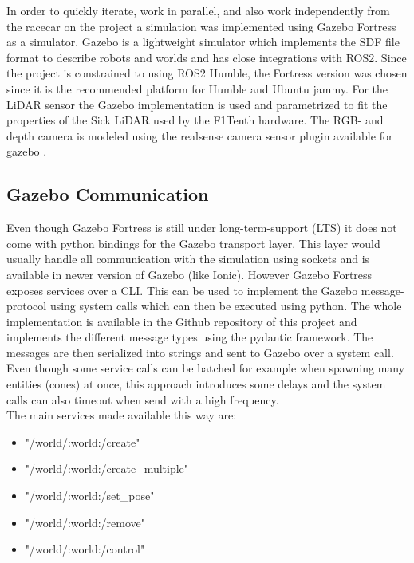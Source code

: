 In order to quickly iterate, work in parallel, and also work independently from the racecar on the project a simulation was implemented using Gazebo Fortress as a simulator.
Gazebo is a lightweight simulator which implements the SDF file format to describe robots and worlds and has close integrations with ROS2.
Since the project is constrained to using ROS2 Humble, the Fortress version was chosen since it is the recommended platform for Humble and Ubuntu jammy.
For the LiDAR sensor the Gazebo implementation is used and parametrized to fit the properties of the Sick LiDAR used by the F1Tenth hardware.
The RGB- and depth camera is modeled using the realsense camera sensor plugin available for gazebo \cite{realsense-gazebo}.

\subsection{Gazebo Communication}

Even though Gazebo Fortress is still under long-term-support (LTS) it does not come with python bindings for the Gazebo transport layer. 
This layer would usually handle all communication with the simulation using sockets and is available in newer version of Gazebo (like Ionic). 
However Gazebo Fortress exposes services over a CLI. This can be used to implement the Gazebo message-protocol using system calls which can then be executed using python. 
The whole implementation is available in the Github repository of this project and implements the different message types using the pydantic framework. 
The messages are then serialized into strings and sent to Gazebo over a system call. 
Even though some service calls can be batched for example when spawning many entities (cones) at once, 
this approach introduces some delays and the system calls can also timeout when send with a high frequency.\\
\newline
The main services made available this way are:

\begin{itemize}
\item "/world/:world:/create"
\item "/world/:world:/create\_multiple"
\item "/world/:world:/set\_pose"
\item "/world/:world:/remove"
\item "/world/:world:/control"
\end{itemize}


